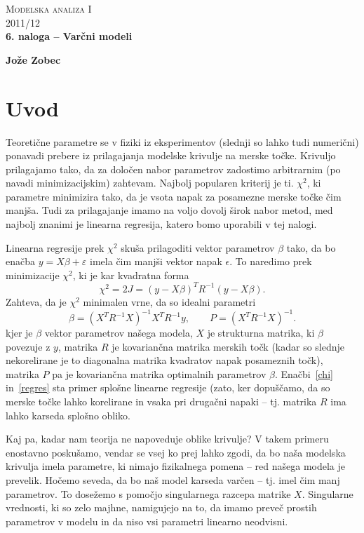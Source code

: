 \documentclass[a4 paper, 12pt]{article}
\begin{document}
\begin{center}
\textsc{Modelska analiza I}\\
\textsc{2011/12}\\[0.5cm]
\textbf{6. naloga -- Var\v cni modeli}
\end{center}
\begin{flushright}
\textbf{Jo\v ze Zobec}
\end{flushright}

\section{Uvod}

Teoreti\v cne parametre se v fiziki iz eksperimentov (slednji so lahko tudi numeri\v cni) ponavadi prebere iz
prilagajanja modelske krivulje na merske to\v cke. Krivuljo prilagajamo tako, da za dolo\v cen nabor parametrov
zadostimo arbitrarnim (po navadi minimizacijskim) zahtevam. Najbolj popularen kriterij je ti. $\chi^2$, ki parametre
minimizira tako, da je vsota napak za posamezne merske to\v cke \v cim manj\v sa. Tudi za prilagajanje imamo na
voljo dovolj \v sirok nabor metod, med najbolj znanimi je linearna regresija, katero bomo uporabili v tej
nalogi.

Linearna regresije prek $\chi^2$ sku\v sa prilagoditi vektor parametrov $\beta$ tako, da bo ena\v cba $y = X\beta +
\varepsilon$ imela \v cim manj\v si vektor napak $\epsilon$. To naredimo prek minimizacije $\chi^2$, ki je kar
kvadratna forma
\begin{equation}
	\chi^2 = 2J = (y - X\beta)^T R^{-1} (y - X\beta).
	\label{chi}
\end{equation}
Zahteva, da je $\chi^2$ minimalen vrne, da so idealni parametri
\begin{equation}
	\beta = (X^T R^{-1} X)^{-1} X^T R^{-1} y, \qquad P = (X^T R^{-1} X)^{-1}.
	\label{regres}
\end{equation}
kjer je $\beta$ vektor parametrov na\v sega modela, $X$ je strukturna matrika, ki $\beta$ povezuje z $y$, matrika $R$
je kovarian\v cna matrika merskih to\v ck (kadar so slednje nekorelirane je to diagonalna matrika kvadratov napak
posameznih to\v ck), matrika $P$ pa je kovarian\v cna matrika optimalnih parametrov $\beta$. Ena\v cbi~\eqref{chi}
in~\eqref{regres} sta primer splo\v sne linearne regresije (zato, ker dopu\v s\v camo, da so merske to\v cke lahko
korelirane in vsaka pri druga\v cni napaki -- tj. matrika $R$ ima lahko karseda splo\v sno obliko.

Kaj pa, kadar nam teorija ne napoveduje oblike krivulje? V takem primeru enostavno posku\v samo, vendar se vsej ko
prej lahko zgodi, da bo na\v sa modelska krivulja imela parametre, ki nimajo fizikalnega pomena -- red na\v sega
modela je prevelik. Ho\v cemo seveda, da bo na\v s model karseda var\v cen -- tj. imel \v cim manj parametrov.
To dose\v zemo s pomo\v cjo singularnega razcepa matrike $X$. Singularne vrednosti, ki so zelo majhne,
namigujejo na to, da imamo preve\v c prostih parametrov v modelu in da niso vsi parametri linearno neodvisni.
\end{document}
